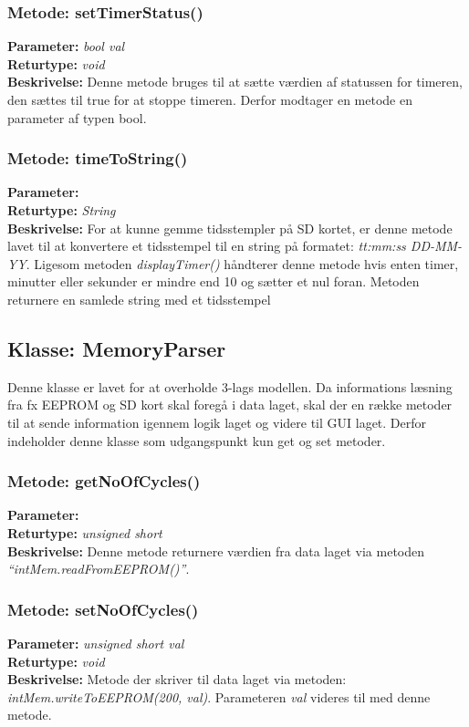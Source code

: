 \subsubsection{Metode: setTimerStatus()}
\textbf{Parameter: } \textit{bool val}
\\ \textbf{Returtype: } \textit{void}
\\ \textbf{Beskrivelse: } Denne metode bruges til at sætte værdien af statussen for timeren, den sættes til true for at stoppe timeren. Derfor modtager en metode en parameter af typen bool. 

\subsubsection{Metode: timeToString()}
\textbf{Parameter: } 
\\ \textbf{Returtype: } \textit{String}
\\ \textbf{Beskrivelse: } For at kunne gemme tidsstempler på SD kortet, er denne metode lavet til at konvertere et tidsstempel til en string på formatet: \textit{tt:mm:ss DD-MM-YY}. Ligesom metoden \textit{displayTimer()} håndterer denne metode hvis enten timer, minutter eller sekunder er mindre end 10 og sætter et nul foran. Metoden returnere en samlede string med et tidsstempel 

\subsection{Klasse: MemoryParser}
Denne klasse er lavet for at overholde 3-lags modellen. Da informations læsning fra fx EEPROM og SD kort skal foregå i data laget, skal der en række metoder til at sende information igennem logik laget og videre til GUI laget. Derfor indeholder denne klasse som udgangspunkt kun get og set metoder. 

\subsubsection{Metode: getNoOfCycles()}
\textbf{Parameter: } 
\\ \textbf{Returtype: } \textit{unsigned short}
\\ \textbf{Beskrivelse: } Denne metode returnere værdien fra data laget via metoden \textit{“intMem.readFromEEPROM()”}.

\subsubsection{Metode: setNoOfCycles()}
\textbf{Parameter: } \textit{unsigned short val}
\\ \textbf{Returtype: } \textit{void}
\\ \textbf{Beskrivelse: } Metode der skriver til data laget via metoden: \textit{intMem.writeToEEPROM(200, val)}. Parameteren \textit{val} videres til med denne metode. 

